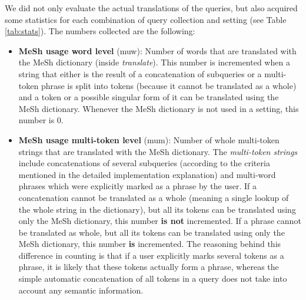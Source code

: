 \documentclass[a4paper,11pt]{article}
\begin{document}
	We did not only evaluate the actual translations of the queries, but also acquired some statistics for each combination of query collection and setting (see Table \ref{tab:stats}). The numbers collected are the following:
	\begin{itemize}
		\item \textbf{MeSh usage word level} (muw): Number of words that are translated with the MeSh dictionary (inside \textit{translate}). This number is incremented when a string that either is the result of a concatenation of subqueries or a multi-token phrase is split into tokens (because it cannot be translated as a whole) and a token or a possible singular form of it can be translated using the MeSh dictionary. Whenever the MeSh dictionary is not used in a setting, this number is 0. 
		\item \textbf{MeSh usage multi-token level} (mum): Number of whole multi-token strings that are translated with the MeSh dictionary. The \textit{multi-token strings} include concatenations of several subqueries (according to the criteria mentioned in the detailed implementation explanation) and multi-word phrases which were explicitly marked as a phrase by the user. If a concatenation cannot be translated as a whole (meaning a single lookup of the whole string in the dictionary), but all its tokens can be translated using only the MeSh dictionary, this number \textbf{is not} incremented. If a phrase cannot be translated as whole, but all its tokens can be translated using only the MeSh dictionary, this number \textbf{is} incremented. The reasoning behind this difference in counting is that if a user explicitly marks several tokens as a phrase, it is likely that these tokens actually form a phrase, whereas the simple automatic concatenation of all tokens in a query does not take into account any semantic information.
		

\end{itemize}
\end{document}
